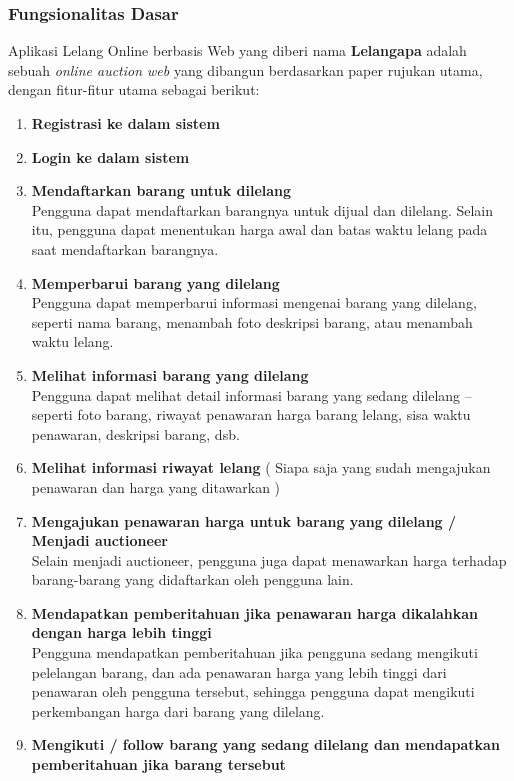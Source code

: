 \subsubsection{Fungsionalitas Dasar}

Aplikasi Lelang Online berbasis Web yang diberi nama \textbf{Lelangapa} adalah sebuah \textit{online auction web} yang dibangun berdasarkan paper rujukan utama, dengan fitur-fitur utama sebagai berikut:

\begin{enumerate}
	\item \textbf{Registrasi ke dalam sistem}
	\item \textbf{Login ke dalam sistem}
	\item \textbf{Mendaftarkan barang untuk dilelang} \\
	Pengguna dapat mendaftarkan barangnya untuk dijual dan dilelang. Selain itu, pengguna dapat menentukan harga awal dan batas waktu lelang pada saat mendaftarkan barangnya.
	\item \textbf{Memperbarui barang yang dilelang} \\
	Pengguna dapat memperbarui informasi mengenai barang yang dilelang, seperti nama barang, menambah foto deskripsi barang, atau menambah waktu lelang.
	\item \textbf{Melihat informasi barang yang dilelang} \\
	Pengguna dapat melihat detail informasi barang yang sedang dilelang – seperti foto barang, riwayat penawaran harga barang lelang, sisa waktu penawaran, deskripsi barang, dsb.
	\item \textbf{Melihat informasi riwayat lelang} ( Siapa saja yang sudah mengajukan penawaran dan harga yang ditawarkan )
	\item \textbf{Mengajukan penawaran harga untuk barang yang dilelang / Menjadi auctioneer} \\
	Selain menjadi auctioneer, pengguna juga dapat menawarkan harga terhadap barang-barang yang didaftarkan oleh pengguna lain.
	\item \textbf{Mendapatkan pemberitahuan jika penawaran harga dikalahkan dengan harga lebih tinggi} \\
	Pengguna mendapatkan pemberitahuan jika pengguna sedang mengikuti pelelangan barang, dan ada penawaran harga yang lebih tinggi dari penawaran oleh pengguna tersebut, sehingga pengguna dapat mengikuti perkembangan harga dari barang yang dilelang.
	\item \textbf{Mengikuti / follow barang yang sedang dilelang dan mendapatkan pemberitahuan jika barang tersebut }\\

\end{enumerate}
